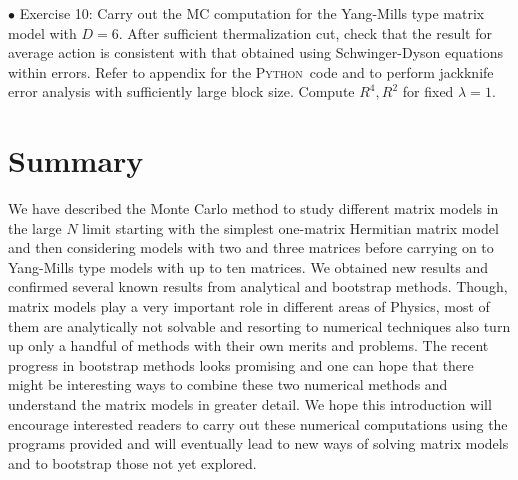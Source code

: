 \documentclass[letter,11pt]{article}
\newcommand{\PY}{\textsc{Python}}
\begin{document}
\begin{mdframed}[backgroundcolor=blue!3] 
	$\bullet$ Exercise 10: Carry out the MC computation for the Yang-Mills type matrix model with $D=6$. After sufficient thermalization cut, check that the result for average action is consistent with that obtained using Schwinger-Dyson equations within errors. Refer to appendix for the \PY~code and to perform jackknife error analysis with sufficiently large block size. Compute $R^4, R^2$ for fixed $\lambda=1$. 
\end{mdframed} 

\section{Summary}

We have described the Monte Carlo method to study different matrix models in the large $N$ limit starting with the simplest one-matrix Hermitian matrix model and then considering models with two and three matrices before carrying on to Yang-Mills type models with up to ten matrices. We obtained new results and confirmed several known results from analytical and bootstrap methods. Though, matrix models play a very important role in different areas of Physics, most of them are analytically not solvable and resorting to numerical techniques also turn up only a handful of methods with their own merits and problems. The recent progress in bootstrap methods looks promising and one can hope that there might be interesting ways to combine these two numerical methods and understand the matrix models in greater detail. We hope this introduction will encourage interested readers to carry out these numerical computations using the programs provided and will eventually lead to new ways of solving matrix models and to bootstrap those not yet explored.
\vspace{8mm}
\end{document}

